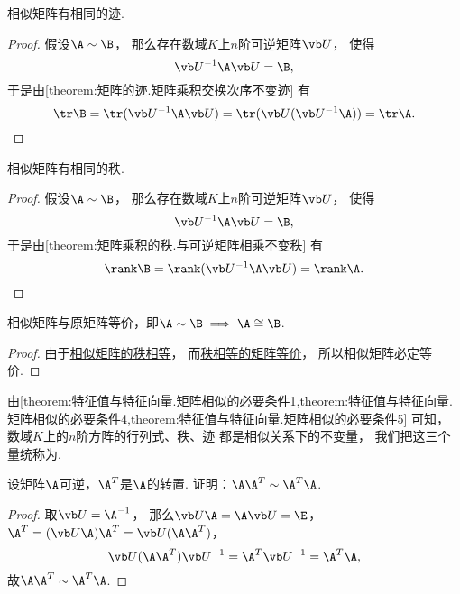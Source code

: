\begin{property}\label{theorem:特征值与特征向量.矩阵相似的必要条件4}
相似矩阵有相同的迹.
\begin{proof}
假设\(\A\sim\B\)，
那么存在数域\(K\)上\(n\)阶可逆矩阵\(\P\)，
使得\[
	\P^{-1}\A\P=\B,
\]
于是由\cref{theorem:矩阵的迹.矩阵乘积交换次序不变迹} 有\[
	\tr\B
	= \tr(\P^{-1}\A\P)
	= \tr(\P(\P^{-1}\A))
	= \tr\A.
	\qedhere
\]
\end{proof}
\end{property}

\begin{property}\label{theorem:特征值与特征向量.矩阵相似的必要条件5}
相似矩阵有相同的秩.
\begin{proof}
假设\(\A\sim\B\)，
那么存在数域\(K\)上\(n\)阶可逆矩阵\(\P\)，
使得\[
	\P^{-1}\A\P=\B,
\]
于是由\cref{theorem:矩阵乘积的秩.与可逆矩阵相乘不变秩} 有\[
	\rank\B = \rank(\P^{-1}\A\P)
	= \rank\A.
	\qedhere
\]
\end{proof}
\end{property}

\begin{property}
相似矩阵与原矩阵等价，即\(\A\sim\B \implies \A\cong\B\).
\begin{proof}
由于\hyperref[theorem:特征值与特征向量.矩阵相似的必要条件5]{相似矩阵的秩相等}，
而\hyperref[theorem:矩阵乘积的秩.矩阵等价的充分必要条件]{秩相等的矩阵等价}，
所以相似矩阵必定等价.
\end{proof}
\end{property}

\begin{remark}
由\cref{theorem:特征值与特征向量.矩阵相似的必要条件1,theorem:特征值与特征向量.矩阵相似的必要条件4,theorem:特征值与特征向量.矩阵相似的必要条件5} 可知，
数域\(K\)上的\(n\)阶方阵的行列式、秩、迹
都是相似关系下的不变量，
我们把这三个量统称为.
\end{remark}

\begin{example}
设矩阵\(\A\)可逆，\(\A^T\)是\(\A\)的转置.
证明：\(\A\A^T \sim \A^T\A\).
\begin{proof}
取\(\P=\A^{-1}\)，
那么\(\P\A=\A\P=\E\)，\(\A^T = (\P\A)\A^T = \P(\A\A^T)\)，\[
	\P(\A\A^T)\P^{-1} = \A^T\P^{-1} = \A^T\A,
\]
故\(\A\A^T \sim \A^T\A\).
\end{proof}
\end{example}

